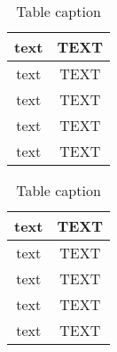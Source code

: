 \begin {table}[h]
    \begin{minipage}{.5\linewidth}
        \begin{center}
        \caption {Table caption} 
        \label{tab:title} 
        \begin{tabular}{|c|c|}\hline 
        \rowcolor{cadetgrey}
        \textbf{text}   & \textbf{TEXT} \\ \hline 
        text    &   TEXT        \\ \rowcolor{gainsboro}
        text    &   TEXT        \\
        text    &   TEXT        \\ \rowcolor{gainsboro}
        text    &   TEXT        \\
        \hline
        \end{tabular}
        \end{center}
    \end{minipage}
    \begin{minipage}{.5\linewidth}
        \begin{center}
        \caption {Table caption} 
        \label{tab:title} 
        \begin{tabular}{|c|c|}\hline 
        \rowcolor{cadetgrey}
        \textbf{text}   & \textbf{TEXT} \\ \hline 
        text    &   TEXT        \\ \rowcolor{gainsboro}
        text    &   TEXT        \\
        text    &   TEXT        \\ \rowcolor{gainsboro}
        text    &   TEXT        \\
        \hline
        \end{tabular}
        \end{center}
    \end{minipage}
\end{table}



